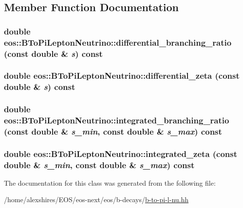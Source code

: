 \subsection{Member Function Documentation}
\hypertarget{classeos_1_1BToPiLeptonNeutrino_a07ce4913ec14c9509a77f3b917faacb8}{
\subsubsection[{differential\_\-branching\_\-ratio}]{\setlength{\rightskip}{0pt plus 5cm}double eos::BToPiLeptonNeutrino::differential\_\-branching\_\-ratio (const double \& {\em s}) const}}
\label{classeos_1_1BToPiLeptonNeutrino_a07ce4913ec14c9509a77f3b917faacb8}
\hypertarget{classeos_1_1BToPiLeptonNeutrino_a4b67b6e7c84ddb7e9f89e2ae4b8c9d55}{
\subsubsection[{differential\_\-zeta}]{\setlength{\rightskip}{0pt plus 5cm}double eos::BToPiLeptonNeutrino::differential\_\-zeta (const double \& {\em s}) const}}
\label{classeos_1_1BToPiLeptonNeutrino_a4b67b6e7c84ddb7e9f89e2ae4b8c9d55}
\hypertarget{classeos_1_1BToPiLeptonNeutrino_a7fde1afb0cc7d836fd227828060901aa}{
\subsubsection[{integrated\_\-branching\_\-ratio}]{\setlength{\rightskip}{0pt plus 5cm}double eos::BToPiLeptonNeutrino::integrated\_\-branching\_\-ratio (const double \& {\em s\_\-min}, \/  const double \& {\em s\_\-max}) const}}
\label{classeos_1_1BToPiLeptonNeutrino_a7fde1afb0cc7d836fd227828060901aa}
\hypertarget{classeos_1_1BToPiLeptonNeutrino_aa4cf04477445478224ca123f5842dc52}{
\subsubsection[{integrated\_\-zeta}]{\setlength{\rightskip}{0pt plus 5cm}double eos::BToPiLeptonNeutrino::integrated\_\-zeta (const double \& {\em s\_\-min}, \/  const double \& {\em s\_\-max}) const}}
\label{classeos_1_1BToPiLeptonNeutrino_aa4cf04477445478224ca123f5842dc52}


The documentation for this class was generated from the following file:\begin{DoxyCompactItemize}
\item 
/home/alexshires/EOS/eos-\/next/eos/b-\/decays/\hyperlink{b-to-pi-l-nu_8hh}{b-\/to-\/pi-\/l-\/nu.hh}\end{DoxyCompactItemize}

